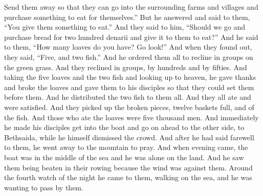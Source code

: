 \begin{biblechapter}
\verse Send them away so that they can go into the surrounding farms and villages and purchase something to eat for themselves.”
\verse But he answered and said to them, “You give them something to eat.” And they said to him, “Should we go and purchase bread for two hundred denarii and give it to them to eat?”
\verse And he said to them, “How many loaves do you have? Go look!” And when they found out, they said, “Five, and two fish.”
\verse And he ordered them all to recline in groups on the green grass.
\verse And they reclined in groups, by hundreds and by fifties.
\verse And taking the five loaves and the two fish and looking up to heaven, he gave thanks and broke the loaves and gave them to his disciples so that they could set them before them. And he distributed the two fish to them all.
\verse And they all ate and were satisfied.
\verse And they picked up the broken pieces, twelve baskets full, and of the fish.
\verse And those who ate the loaves were five thousand men.
 And immediately he made his disciples get into the boat and go on ahead to the other side, to Bethsaida, while he himself dismissed the crowd.
\verse And after he had said farewell to them, he went away to the mountain to pray.
\verse And when evening came, the boat was in the middle of the sea and he was alone on the land.
\verse And he saw them being beaten in their rowing because the wind was against them. Around the fourth watch of the night he came to them, walking on the sea, and he was wanting to pass by them.

\end{biblechapter}
